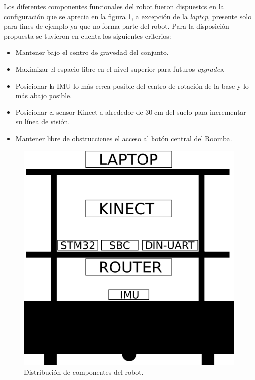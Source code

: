 Los diferentes componentes funcionales del robot fueron dispuestos en la configuración que se aprecia en la figura \ref{fig:lubobotComponentes}, a excepción de la \textit{laptop}, presente solo para fines de ejemplo ya que no forma parte del robot. Para la disposición propuesta se tuvieron en cuenta los siguientes criterios:

\begin{itemize}
  \item Mantener bajo el centro de gravedad del conjunto.
  \item Maximizar el espacio libre en el nivel superior para futuros \textit{upgrades}.
  \item Posicionar la IMU lo más cerca posible del centro de rotación de la base y lo más abajo posible.
  \item Posicionar el sensor Kinect a alrededor de 30 cm del suelo para incrementar su línea de visión.
  \item Mantener libre de obstrucciones el acceso al botón central del Roomba.
\end{itemize}

\begin{figure}[ht]
  \centering
  \includegraphics[scale=0.4]{./Figures/distribucion_componentes.png}
  \caption{Distribución de componentes del robot.}
  \label{fig:lubobotComponentes}
\end{figure}

